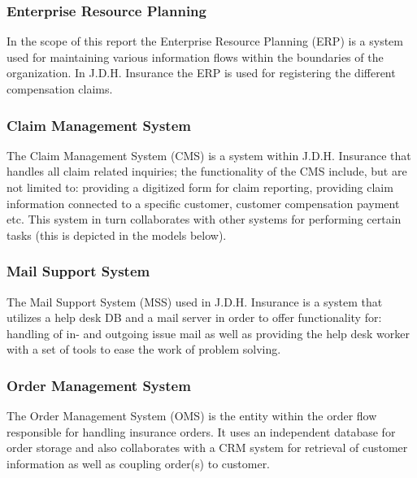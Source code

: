 \subsubsection{Enterprise Resource Planning}
\label{sec:erp}
In the scope of this report the Enterprise Resource Planning (ERP) is a system used for maintaining various information flows within the boundaries of the organization. In J.D.H. Insurance the ERP is used for registering the different compensation claims.      
\subsubsection{Claim Management System}
\label{sec:cms}
The Claim Management System (CMS) is a system within J.D.H. Insurance that handles all claim related inquiries; the functionality of the CMS include, but are not limited to: providing a digitized form for claim reporting, providing claim information connected to a specific customer, customer compensation payment etc. This system in turn collaborates with other systems for performing certain tasks (this is depicted in the models below).
\subsubsection{Mail Support System}
\label{sec:mss}
The Mail Support System (MSS) used in J.D.H. Insurance is a system that utilizes a help desk DB and a mail server in order to offer functionality for: handling of in- and outgoing issue mail as well as providing the help desk worker with a set of tools to ease the work of problem solving. 
\subsubsection{Order Management System}
\label{sec:oms}
The Order Management System (OMS) is the entity within the order flow responsible for handling insurance orders. It uses an independent database for order storage and also collaborates with a CRM system for retrieval of customer information as well as coupling order(s) to customer.  

